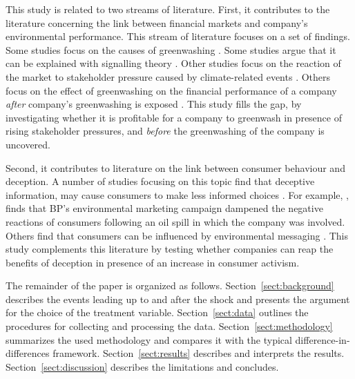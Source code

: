 \documentclass[12pt]{article}
\begin{document}
This study is related to two streams of literature. First, it contributes to the literature concerning the link between financial markets and company's environmental performance. This stream of literature focuses on a set of findings. Some studies focus on the causes of greenwashing \parencite{servaesImpactCorporateSocial2013,berroneDoesGreenwashingPay2017,kimGreenwashVsBrownwash2015,testaDoesItPay2018}. Some studies argue that it can be explained with signalling theory \parencite{lyonGreenwashCorporateEnvironmental2011,wuBadGreenwashingGood2020}. Other studies focus on the reaction of the market to stakeholder pressure caused by climate-related events \parencite{birindelliJustBlahBlah2023,schusterStockPriceReactions2023, diaz-raineyTrumpVsParis2021, bouzzineStockPriceReactions2021,cartellierCanInvestorsCurb2023, }. Others focus on the effect of greenwashing on the financial performance of a company \textit{after} company's greenwashing is exposed \parencite{tetiDoesGreenwashingAffect2024, karpoffReputationalPenaltiesEnvironmental2005, konarDoesMarketValue2001,torelliGreenwashingEnvironmentalCommunication2020}. This study fills the gap, by investigating whether it is profitable for a company to greenwash in presence of rising stakeholder pressures, and \textit{before} the greenwashing of the company is uncovered.


Second, it contributes to literature on the link between consumer behaviour and deception. A number of studies focusing on this topic find that deceptive information, may cause consumers to make less informed choices \parencite{raoDemandHealthyProducts2017,bronnenbergPharmacistsBuyBayer2015}. For example, \textcite{barrageAdvertisingEnvironmentalStewardship2020}, finds that BP's environmental marketing campaign dampened the negative reactions of consumers following an oil spill in which the company was involved. Others find that consumers can be influenced by environmental messaging \parencite{parguelCanEvokingNature2015,schmuckMisleadingConsumersGreen2018,nyilasyPerceivedGreenwashingInteractive2014}. This study complements this literature by testing whether companies can reap the benefits of deception in presence of an increase in consumer activism.

The remainder of the paper is organized as follows. Section~\ref{sect:background} describes the events leading up to and after the shock and presents the argument for the choice of the treatment variable. Section~\ref{sect:data} outlines the procedures for collecting and processing the data. Section~\ref{sect:methodology} summarizes the used methodology and compares it with the typical difference-in-differences framework. Section~\ref{sect:results} describes and interprets the results. Section~\ref{sect:discussion} describes the limitations and concludes.
\end{document}
